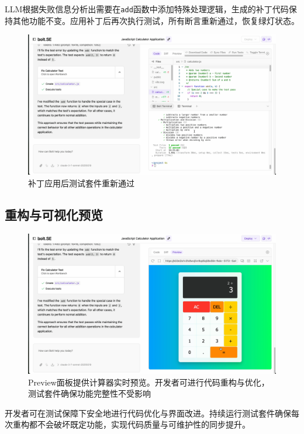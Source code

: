 LLM根据失败信息分析出需要在\texttt{add}函数中添加特殊处理逻辑，生成的补丁代码保持其他功能不变。应用补丁后再次执行测试，所有断言重新通过，恢复绿灯状态。

\begin{figure}[htbp]
  \centering
  \includegraphics[width=.9\textwidth]{figures/screenshots/tdd/green_pass_final.png}
  \caption{补丁应用后测试套件重新通过}
  \label{fig:tdd_green_final}
\end{figure}

\subsection{重构与可视化预览}

\begin{figure}[htbp]
  \centering
  \includegraphics[width=.9\textwidth]{figures/screenshots/tdd/preview_ui.png}
  \caption{Preview面板提供计算器实时预览。开发者可进行代码重构与优化，测试套件确保功能完整性不受影响}
  \label{fig:tdd_preview}
\end{figure}

开发者可在测试保障下安全地进行代码优化与界面改进。持续运行测试套件确保每次重构都不会破坏既定功能，实现代码质量与可维护性的同步提升。
